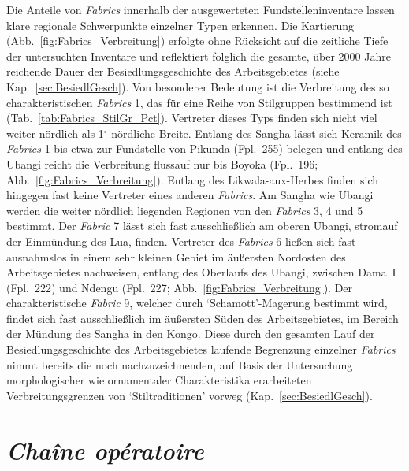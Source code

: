 \vspace{1.5em}
\noindent Die Anteile von \textit{Fabrics} innerhalb der ausgewerteten Fundstelleninventare lassen klare regionale Schwerpunkte einzelner Typen erkennen. Die Kartierung (Abb.~\ref{fig:Fabrics_Verbreitung}) erfolgte ohne Rücksicht auf die zeitliche Tiefe der untersuchten Inventare und reflektiert folglich die gesamte, über 2000 Jahre reichende Dauer der Besiedlungsgeschichte des Arbeitsgebietes (siehe Kap.~\ref{sec:BesiedlGesch}). Von besonderer Bedeutung ist die Verbreitung des so charakteristischen \textit{Fabrics} 1, das für eine Reihe von Stilgruppen bestimmend ist (Tab.~\ref{tab:Fabrics_StilGr_Pct}). Vertreter dieses Typs finden sich nicht viel weiter nördlich als 1$^\circ$ nördliche Breite. Entlang des Sangha lässt sich Keramik des \textit{Fabrics} 1 bis etwa zur Fundstelle von Pikunda (Fpl.~255) belegen und entlang des Ubangi reicht die Verbreitung flussauf nur bis Boyoka (Fpl.~196; Abb.~\ref{fig:Fabrics_Verbreitung}). Entlang des Likwala-aux-Herbes finden sich hingegen fast keine Vertreter eines anderen \textit{Fabrics}. Am Sangha wie Ubangi werden die weiter nördlich liegenden Regionen von den \textit{Fabrics} 3, 4 und 5 bestimmt. Der \textit{Fabric} 7 lässt sich fast ausschließlich am oberen Ubangi, stromauf der Einmündung des Lua, finden. Vertreter des \textit{Fabrics} 6 ließen sich fast ausnahmslos in einem sehr kleinen Gebiet im äußersten Nordosten des Arbeitsgebietes nachweisen, entlang des Oberlaufs des Ubangi, zwischen Dama~I (Fpl.~222) und Ndengu (Fpl.~227; Abb.~\ref{fig:Fabrics_Verbreitung}). Der charakteristische \textit{Fabric} 9, welcher durch \enquote*{Schamott}-Magerung bestimmt wird, findet sich fast ausschließlich im äußersten Süden des Arbeitsgebietes, im Bereich der Mündung des Sangha in den Kongo. Diese durch den gesamten Lauf der Besiedlungsgeschichte des Arbeitsgebietes laufende Begrenzung einzelner \textit{Fabrics} nimmt bereits die noch nachzuzeichnenden, auf Basis der Untersuchung morphologischer wie ornamentaler Charakteristika erarbeiteten Verbreitungsgrenzen von \enquote*{Stiltraditionen} vorweg (Kap.~\ref{sec:BesiedlGesch}).


\section{\textit{Chaîne opératoire}}\label{sec:Herstellung_ChaineOperatoire}

